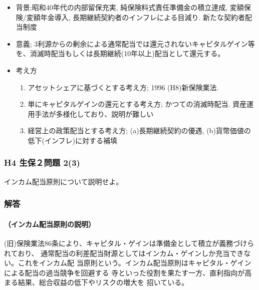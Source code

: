 \documentclass[report,gutter=10mm,fore-edge=10mm,uplatex,dvipdfmx]{jlreq}
\begin{document}
\begin{itemize}
 \item 背景;昭和40年代の内部留保充実, 純保険料式責任準備金の積立達成, 変額保険/変額年金導入, 長期継続契約者のインフレによる目減り.   新たな契約者配当制度
 \item 意義; 3利源からの剰余による通常配当では還元されないキャピタルゲイン等を、消滅時配当もしくは長期継続(10年以上)配当として還元する。
 \item 考え方
\begin{enumerate} [(1)]
 \item アセットシェアに基づくとする考え方;  1996 (H8)新保険業法.  
 \item 単にキャピタルゲインの還元とする考え方; かつての消滅時配当. 資産運用手法が多様化しており、説明が難しい
 \item 経営上の政策配当とする考え方; (a)長期継続契約の優遇, (b)貨幣価値の低下(インフレ)に対する補填
\end{enumerate}
\end{itemize}

\subsubsection{H4 生保２問題 2(3)}
インカム配当原則について説明せよ。
\subsubsection{解答}

\paragraph{（インカム配当原則の説明）}
(旧)保険業法86条により、キャピタル・ゲインは準備金として積立が義務づけられており、
通常配当の利差配当財源としてはインカム・ゲインしか充当できない。これをインカム配
当原則という。インカム配当原則はキャピタル・ゲインによる配当の過当競争を回避する
寺といった役割を果たす一方、直利指向が高まる結果、総合収益の低下やリスクの増大を
招いている。
\end{document}

